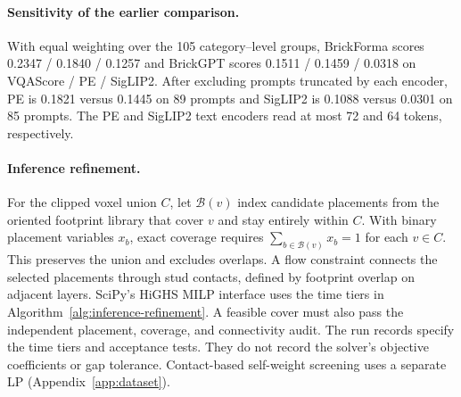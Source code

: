 \documentclass[letterpaper]{article} %
\begin{document}
\paragraph{Sensitivity of the earlier comparison.}
With equal weighting over the 105 category--level groups, BrickForma scores 0.2347 / 0.1840 / 0.1257 and BrickGPT scores 0.1511 / 0.1459 / 0.0318 on VQAScore / PE / SigLIP2. After excluding prompts truncated by each encoder, PE is 0.1821 versus 0.1445 on 89 prompts and SigLIP2 is 0.1088 versus 0.0301 on 85 prompts. The PE and SigLIP2 text encoders read at most 72 and 64 tokens, respectively.

\paragraph{Inference refinement.}
For the clipped voxel union $C$, let $\mathcal{B}(v)$ index candidate placements from the oriented footprint library that cover $v$ and stay entirely within $C$. With binary placement variables $x_b$, exact coverage requires $\sum_{b\in\mathcal{B}(v)}x_b=1$ for each $v\in C$. This preserves the union and excludes overlaps. A flow constraint connects the selected placements through stud contacts, defined by footprint overlap on adjacent layers. SciPy's HiGHS MILP interface uses the time tiers in Algorithm~\ref{alg:inference-refinement}. A feasible cover must also pass the independent placement, coverage, and connectivity audit. The run records specify the time tiers and acceptance tests. They do not record the solver's objective coefficients or gap tolerance. Contact-based self-weight screening uses a separate LP (Appendix~\ref{app:dataset}).
\end{document}

